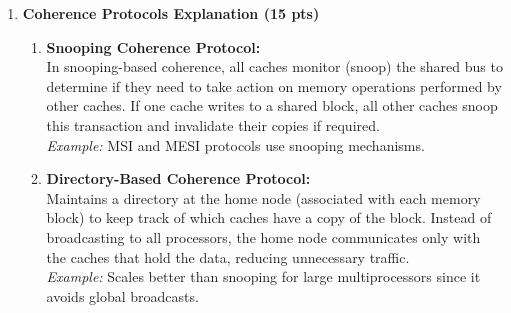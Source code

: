 \documentclass[11pt]{article}
\begin{document}
\begin{enumerate}
    \item \textbf{Coherence Protocols Explanation (15 pts)} \\
    \begin{enumerate}[label=\alph*.]
        \item \textbf{Snooping Coherence Protocol:} \\
        In snooping-based coherence, all caches monitor (snoop) the shared bus to determine if they need to take action on memory operations performed by other caches. If one cache writes to a shared block, all other caches snoop this transaction and invalidate their copies if required.
        \\ \textit{Example:} MSI and MESI protocols use snooping mechanisms.

        \item \textbf{Directory-Based Coherence Protocol:} \\
        Maintains a directory at the home node (associated with each memory block) to keep track of which caches have a copy of the block. Instead of broadcasting to all processors, the home node communicates only with the caches that hold the data, reducing unnecessary traffic.
        \\ \textit{Example:} Scales better than snooping for large multiprocessors since it avoids global broadcasts.
    \end{enumerate}


\end{enumerate}
\end{document}

